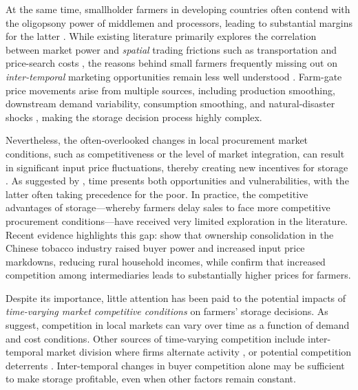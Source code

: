 At the same time, smallholder farmers in developing countries often contend with the oligopsony power of middlemen and processors, leading to substantial margins for the latter \citep{rogers_rich_1994assessing}. While existing literature primarily explores the correlation between market power and \textit{spatial} trading frictions such as transportation and price-search costs \citep{bergquist_dinerstein_2020, mitra_mookherjee_torero_visaria_2018, ranjan_2017, antras_costinot_2011, jung2022structural}, the reasons behind small farmers frequently missing out on \textit{inter-temporal} marketing opportunities remain less well understood \citep{williams1991storage, wright1984welfare, ruhinduka2020smallholder, lai2003optimal}. Farm-gate price movements arise from multiple sources, including production smoothing, downstream demand variability, consumption smoothing, and natural-disaster shocks \citep{tomek2001risk, channa2022overcoming}, making the storage decision process highly complex.


Nevertheless, the often-overlooked changes in local procurement market conditions, such as competitiveness or the level of market integration, can result in significant input price fluctuations, thereby creating new incentives for storage \citep{dries2009farmers, kopp2021farmers}. As suggested by \cite{zimmerman2003asset}, time presents both opportunities and vulnerabilities, with the latter often taking precedence for the poor. In practice, the competitive advantages of storage—whereby farmers delay sales to face more competitive procurement conditions—have received very limited exploration in the literature. Recent evidence highlights this gap: \cite{rubens2023market} show that ownership consolidation in the Chinese tobacco industry raised buyer power and increased input price markdowns, reducing rural household incomes, while \cite{chatterjee2023market} confirm that increased competition among intermediaries leads to substantially higher prices for farmers.


Despite its importance, little attention has been paid to the potential impacts of \textit{time-varying market competitive conditions} on farmers' storage decisions. As \cite{sudhir2005time} suggest, competition in local markets can vary over time as a function of demand and cost conditions. Other sources of time-varying competition include inter-temporal market division where firms alternate activity \citep{herings2005intertemporal}, or potential competition deterrents \citep{gilbert1989role, stiglitz1981potential}. Inter-temporal changes in buyer competition alone may be sufficient to make storage profitable, even when other factors remain constant.


